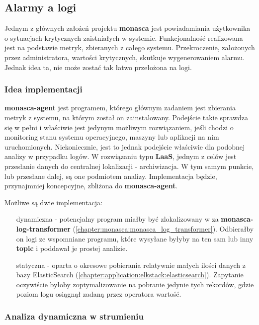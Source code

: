 \subsection{Alarmy a logi}
\label{chapter:application:plans:alarm_on_logs}

Jednym z głównych założeń projektu \textbf{monasca} jest powiadamiania użytkownika o 
sytuacjach krytycznych zaistniałych w systemie. Funkcjonalność realizowana jest na podstawie
metryk, zbieranych z całego systemu. Przekroczenie, założonych przez administratora, wartości
krytycznych, skutkuje wygenerowaniem alarmu. Jednak idea ta, nie może zostać
tak łatwo przełożona na logi. 

    \subsubsection{Idea implementacji}
    \textbf{monasca-agent} jest programem, którego głównym zadaniem jest zbierania metryk z systemu, na którym
    został on zainstalowany. Podejście takie sprawdza się w pełni i właściwie jest jedynym możliwym rozwiązaniem,
    jeśli chodzi o monitoring stanu systemu operacyjnego, maszyny lub aplikacji na nim uruchomionych. Niekoniecznie,
    jest to jednak podejście właściwie dla podobnej analizy w przypadku logów. W rozwiązaniu typu \textbf{LaaS}, 
    jednym z celów jest przesłanie danych do centralnej lokalizacji - archiwizacja. W tym samym punkcie, lub
    przesłane dalej, są one podmiotem analizy. Implementacja będzie, przynajmniej koncepcyjne, zbliżona do \textbf{monasca-agent}.
    
    Możliwe są dwie implementacja:
    \begin{itemize}
        \item[dynamiczna] - potencjalny program miałby być zlokalizowany w za \textbf{monasca-log-transformer} (\ref{chapter:monasca:monasca_log_transformer}).
        Odbierałby on logi ze wspomniane programu, które wysyłane byłyby na ten sam lub inny \textbf{topic} i poddawał je prostej analizie. 
        \item[statyczna] - oparta o okresowe pobierania relatywnie małych ilości danych z bazy ElasticSearch (\ref{chapter:application:elkstack:elasticsearch}). 
        Zapytanie oczywiście byłoby zoptymalizowanie na pobranie jedynie tych rekordów, gdzie poziom logu osiągnął zadaną przez operatora wartość.
    \end{itemize}
    
    \subsubsection{Analiza dynamiczna w strumieniu}
    \label{chapter:application:plans:alarm_on_logs:streaming}
    
